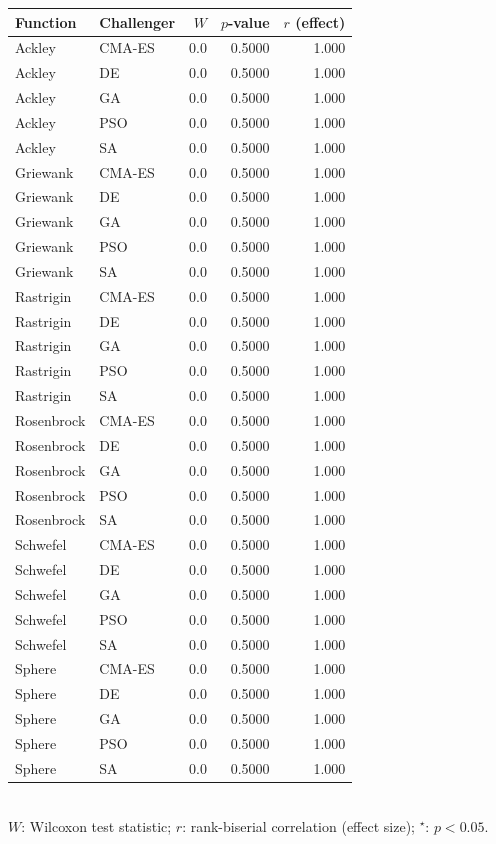 \begin{table}[htb]
\medskip
\begin{tabular}{llrrr}
\toprule
Function & Challenger & $W$ & $p$-value & $r$ (effect) \\
\midrule
  Ackley & CMA-ES & 0.0 & 0.5000 & 1.000 \\
  Ackley & DE & 0.0 & 0.5000 & 1.000 \\
  Ackley & GA & 0.0 & 0.5000 & 1.000 \\
  Ackley & PSO & 0.0 & 0.5000 & 1.000 \\
  Ackley & SA & 0.0 & 0.5000 & 1.000 \\
  Griewank & CMA-ES & 0.0 & 0.5000 & 1.000 \\
  Griewank & DE & 0.0 & 0.5000 & 1.000 \\
  Griewank & GA & 0.0 & 0.5000 & 1.000 \\
  Griewank & PSO & 0.0 & 0.5000 & 1.000 \\
  Griewank & SA & 0.0 & 0.5000 & 1.000 \\
  Rastrigin & CMA-ES & 0.0 & 0.5000 & 1.000 \\
  Rastrigin & DE & 0.0 & 0.5000 & 1.000 \\
  Rastrigin & GA & 0.0 & 0.5000 & 1.000 \\
  Rastrigin & PSO & 0.0 & 0.5000 & 1.000 \\
  Rastrigin & SA & 0.0 & 0.5000 & 1.000 \\
  Rosenbrock & CMA-ES & 0.0 & 0.5000 & 1.000 \\
  Rosenbrock & DE & 0.0 & 0.5000 & 1.000 \\
  Rosenbrock & GA & 0.0 & 0.5000 & 1.000 \\
  Rosenbrock & PSO & 0.0 & 0.5000 & 1.000 \\
  Rosenbrock & SA & 0.0 & 0.5000 & 1.000 \\
  Schwefel & CMA-ES & 0.0 & 0.5000 & 1.000 \\
  Schwefel & DE & 0.0 & 0.5000 & 1.000 \\
  Schwefel & GA & 0.0 & 0.5000 & 1.000 \\
  Schwefel & PSO & 0.0 & 0.5000 & 1.000 \\
  Schwefel & SA & 0.0 & 0.5000 & 1.000 \\
  Sphere & CMA-ES & 0.0 & 0.5000 & 1.000 \\
  Sphere & DE & 0.0 & 0.5000 & 1.000 \\
  Sphere & GA & 0.0 & 0.5000 & 1.000 \\
  Sphere & PSO & 0.0 & 0.5000 & 1.000 \\
  Sphere & SA & 0.0 & 0.5000 & 1.000 \\
\bottomrule
\end{tabular}
\\ \footnotesize{$W$: Wilcoxon test statistic; $r$: rank-biserial correlation (effect size); $^\star$: $p < 0.05$.}
\end{table}